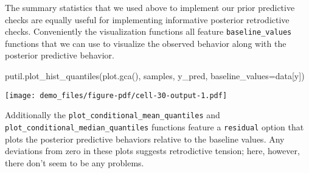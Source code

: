\documentclass[
  letterpaper,
  DIV=11,
  numbers=noendperiod]{scrartcl}
\newenvironment{Shaded}{\begin{snugshade}}{\end{snugshade}}
\newcommand{\NormalTok}[1]{\textcolor[rgb]{0.00,0.23,0.31}{#1}}
\newcommand{\OperatorTok}[1]{\textcolor[rgb]{0.37,0.37,0.37}{#1}}
\newcommand{\StringTok}[1]{\textcolor[rgb]{0.13,0.47,0.30}{#1}}
\begin{document}
The summary statistics that we used above to implement our prior
predictive checks are equally useful for implementing informative
posterior retrodictive checks. Conveniently the visualization functions
all feature \texttt{baseline\_values} functions that we can use to
visualize the observed behavior along with the posterior predictive
behavior.

\begin{Shaded}
\begin{Highlighting}[]
\NormalTok{putil.plot\_hist\_quantiles(plot.gca(), samples, }\StringTok{\textquotesingle{}y\_pred\textquotesingle{}}\NormalTok{,}
\NormalTok{                          baseline\_values}\OperatorTok{=}\NormalTok{data[}\StringTok{\textquotesingle{}y\textquotesingle{}}\NormalTok{])}
\end{Highlighting}
\end{Shaded}

\texttt{[image: demo\_files/figure-pdf/cell-30-output-1.pdf]}

Additionally the \texttt{plot\_conditional\_mean\_quantiles} and
\texttt{plot\_conditional\_median\_quantiles} functions feature a
\texttt{residual} option that plots the posterior predictive behaviors
relative to the baseline values. Any deviations from zero in these plots
suggests retrodictive tension; here, however, there don't seem to be any
problems.
\end{document}
